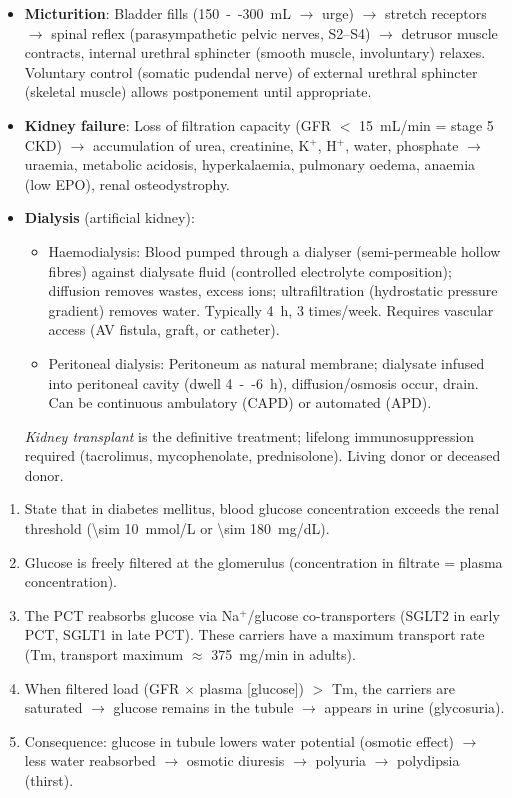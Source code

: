 \documentclass[11pt]{article}
\newcommand{\cle}[1]{{\popxbold\color{popdark}#1}}
\begin{document}
\begin{itemize}
\item \textbf{Micturition}: Bladder fills (\SI{150}{--}\SI{300}{mL} $\to$ urge) $\to$ stretch receptors $\to$ spinal reflex (parasympathetic pelvic nerves, S2--S4) $\to$ detrusor muscle contracts, internal urethral sphincter (smooth muscle, involuntary) relaxes. Voluntary control (somatic pudendal nerve) of external urethral sphincter (skeletal muscle) allows postponement until appropriate.
\item \textbf{Kidney failure}: Loss of filtration capacity (GFR $<$ \SI{15}{mL/min} = stage 5 CKD) $\to$ accumulation of urea, creatinine, K$^+$, H$^+$, water, phosphate $\to$ uraemia, metabolic acidosis, hyperkalaemia, pulmonary oedema, anaemia (low EPO), renal osteodystrophy.
\item \textbf{Dialysis} (artificial kidney):
  \begin{itemize}
  \item \cle{Haemodialysis}: Blood pumped through a dialyser (semi-permeable hollow fibres) against dialysate fluid (controlled electrolyte composition); diffusion removes wastes, excess ions; ultrafiltration (hydrostatic pressure gradient) removes water. Typically \SI{4}{h}, 3 times/week. Requires vascular access (AV fistula, graft, or catheter).
  \item \cle{Peritoneal dialysis}: Peritoneum as natural membrane; dialysate infused into peritoneal cavity (dwell \SI{4}{--}\SI{6}{h}), diffusion/osmosis occur, drain. Can be continuous ambulatory (CAPD) or automated (APD).
  \end{itemize}
  \emph{Kidney transplant} is the definitive treatment; lifelong immunosuppression required (tacrolimus, mycophenolate, prednisolone). Living donor or deceased donor.
\end{itemize}

\begin{methode}
\begin{enumerate}
\item State that in diabetes mellitus, blood glucose concentration exceeds the \cle{renal threshold} (\SI{\sim 10}{mmol/L} or \SI{\sim 180}{mg/dL}).
\item Glucose is freely filtered at the glomerulus (concentration in filtrate = plasma concentration).
\item The PCT reabsorbs glucose via Na$^+$/glucose co-transporters (SGLT2 in early PCT, SGLT1 in late PCT). These carriers have a maximum transport rate (\cle{Tm}, transport maximum $\approx$ \SI{375}{mg/min} in adults).
\item When filtered load (GFR $\times$ plasma [glucose]) $>$ Tm, the carriers are saturated $\to$ glucose remains in the tubule $\to$ appears in urine (\cle{glycosuria}).
\item Consequence: glucose in tubule lowers water potential (osmotic effect) $\to$ less water reabsorbed $\to$ osmotic diuresis $\to$ polyuria $\to$ polydipsia (thirst).
\end{enumerate}
\end{methode}
\end{document}
